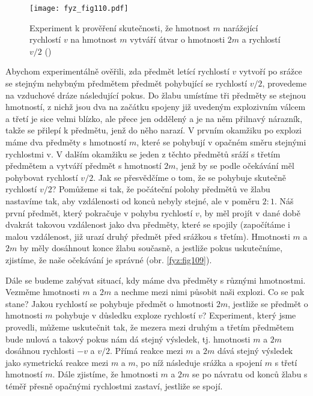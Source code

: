     \begin{figure}[ht!]  %
      \centering
      \texttt{[image: fyz\_fig110.pdf]}
      \caption{Experiment k prověření skutečnosti, že hmotnost \(m\) narážející rychlostí \(v\) na hmotnost 
               \(m\) vytváří útvar o hmotnosti \(2m\) a rychlostí \(v/2\)
              (\cite[s.~146]{Feynman01})}
      \label{fyz:fig110}
    \end{figure}
    Abychom experimentálně ověřili, zda předmět letící rychlostí \(v\) vytvoří po srážce se stejným 
    nehybným předmětem předmět pohybující se rychlostí \(v/2\), provedeme na vzduchové dráze 
    následující pokus. Do žlabu umístíme tři předměty se stejnou hmotností, z nichž jsou dva na 
    začátku spojeny již uvedeným explozivním válcem a třetí je sice velmi blízko, ale přece jen 
    oddělený a je na něm přilnavý nárazník, takže se přilepí k předmětu, jenž do něho narazí. V 
    prvním okamžiku po explozi máme dva předměty s hmotností \(m\), které se pohybují v opačném 
    směru stejnými rychlostmi v. V dalším okamžiku se jeden z těchto předmětů sráží s třetím 
    předmětem a vytváří předmět s hmotností \(2m\), jenž by se podle očekávání měl pohybovat 
    rychlostí \(v/2\). Jak se přesvědčíme o tom, že se pohybuje skutečně rychlostí \(v/2\)? 
    Pomůžeme si tak, že počáteční polohy předmětů ve žlabu nastavíme tak, aby vzdálenosti od konců 
    nebyly stejné, ale v poměru \(2:1\). Náš první předmět, který pokračuje v pohybu rychlostí 
    \(v\), by měl projít v dané době dvakrát takovou vzdálenost jako dva předměty, které se spojily 
    (započítáme i malou vzdálenost, již urazí druhý předmět před srážkou s třetím). Hmotnosti \(m\) 
    a \(2m\) by měly dosáhnout konce žlabu současně, a jestliže pokus uskutečníme, zjistíme, že 
    naše očekávání je správné (obr. \ref{fyz:fig109}).

    Dále se budeme zabývat situací, kdy máme dva předměty s různými hmotnostmi. Vezměme hmotnosti 
    \(m\) a \(2m\) a nechme mezi nimi působit naši explozi. Co se pak stane? Jakou rychlostí se 
    pohybuje předmět o hmotnosti \(2m\), jestliže se předmět o hmotnosti \(m\) pohybuje v důsledku 
    exploze rychlostí \(v\)? Experiment, který jsme provedli, můžeme uskutečnit tak, že mezera mezi 
    druhým a třetím předmětem bude nulová a takový pokus nám dá stejný výsledek, tj. hmotnosti 
    \(m\) a \(2m\) dosáhnou rychlosti \(-v\) a \(v/2\). Přímá reakce mezi \(m\) a \(2m\) dává 
    stejný výsledek jako symetrická reakce mezi \(m\) a \(m\), po níž následuje srážka a spojení 
    \(m\) s třetí hmotností \(m\). Dále zjistíme, že hmotnosti \(m\) a \(2m\) se po návratu od 
    konců žlabu s téměř přesně opačnými rychlostmi zastaví, jestliže se spojí.

